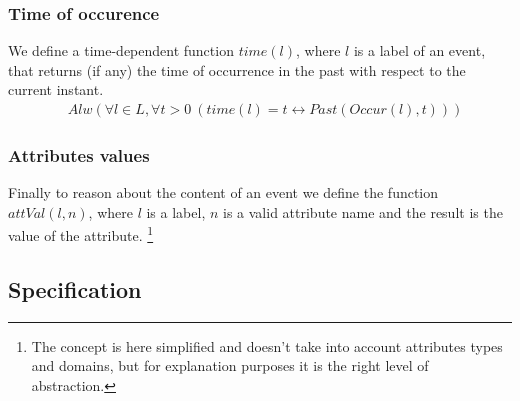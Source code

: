 \subsubsection{Time of occurence}
We define a time-dependent function $time(l)$, where $l$ is a label of an event, that returns (if any) the time of occurrence in the past with respect to the current instant.
\begin{align*}
  &Alw(\forall l \in L, \forall t > 0\ (time(l) = t \leftrightarrow Past(Occur(l), t)))
\end{align*}

\subsubsection{Attributes values}
Finally to reason about the content of an event we define the function $attVal(l, n)$, where $l$ is a label, $n$ is a valid attribute name and the result is the value of the attribute. \footnote{The concept is here simplified and doesn't take into account attributes types and domains, but for explanation purposes it is the right level of abstraction.}

\subsection{Specification}

